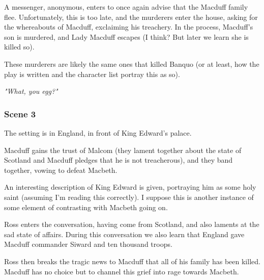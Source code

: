 A messenger, anonymous, enters to once again advise that the Macduff family
flee. Unfortunately, this is too late, and the murderers enter the house,
asking for the whereabouts of Macduff, exclaiming his treachery. In the
process, Macduff's son is murdered, and Lady Macduff escapes (I think? But
later we learn she is killed so).

These murderers are likely the same ones that killed Banquo (or at least, how
the play is written and the character list portray this as so).

\textit{"What, you egg?"}

\subsubsection{Scene 3}

The setting is in England, in front of King Edward's palace.

Macduff gains the trust of Malcom (they lament together about the state of
Scotland and Macduff pledges that he is not treacherous), and they band
together, vowing to defeat Macbeth.

An interesting description of King Edward is given, portraying him as some holy saint (assuming I'm reading this correctly). I suppose this is another instance of some element of contrasting with Macbeth going on. 

Ross enters the conversation, having come from Scotland, and also laments at
the sad state of affairs. During this conversation we also learn that England
gave Macduff commander Siward and ten thousand troops.

Ross then breaks the tragic news to Macduff that all of his family has been
killed. Macduff has no choice but to channel this grief into rage towards
Macbeth.
